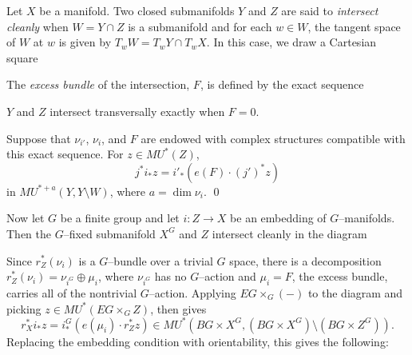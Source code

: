 \begin{definition}
Let $X$ be a manifold.  Two closed submanifolds $Y$ and $Z$ are said to \textit{intersect cleanly} when $W = Y \cap Z$ is a submanifold and for each $w \in W$, the tangent space of $W$ at $w$ is given by $T_w W = T_w Y \cap T_w X$.  In this case, we draw a Cartesian square
\begin{center}
\end{center}
The \textit{excess bundle} of the intersection, $F$, is defined by the exact sequence
\begin{center}
\end{center}
\end{definition}

\begin{remark}
$Y$ and $Z$ intersect transversally exactly when $F = 0$.
\end{remark}

\begin{lemma}\label{CleanIntersectionFormula}
Suppose that $\nu_{i'}$, $\nu_i$, and $F$ are endowed with complex structures compatible with this exact sequence. For $z \in MU^*(Z)$, \[j^* i_* z = i'_*(e(F) \cdot (j')^* z)\] in $MU^{*+a}(Y, Y \setminus W)$, where $a = \dim \nu_i$. \qed {}
\end{lemma}

Now let $G$ be a finite group and let $i: Z \to X$ be an embedding of $G$--manifolds. Then the $G$--fixed submanifold $X^G$ and $Z$ intersect cleanly in the diagram
\begin{center}
\end{center}
Since $r_Z^*(\nu_i)$ is a $G$--bundle over a trivial $G$ space, there is a decomposition $r_Z^*(\nu_i) = \nu_{i^G} \oplus \mu_i$, where $\nu_{i^G}$ has no $G$--action and $\mu_i = F$, the excess bundle, carries all of the nontrivial $G$--action.  Applying $EG \times_G (-)$ to the diagram and picking $z \in MU^*(EG \times_G Z)$,  then gives \[r_X^* i_* z = i^G_*(e(\mu_i) \cdot r_Z^* z) \in MU^*(BG \times X^G, (BG \times X^G) \setminus (BG \times Z^G)).\]  Replacing the embedding condition with orientability, this gives the following:

